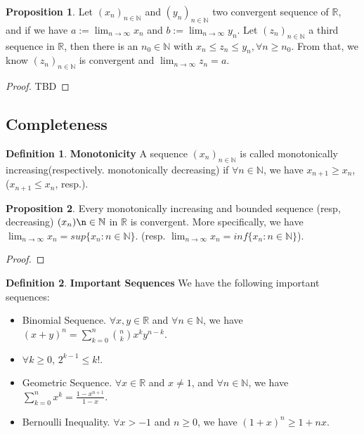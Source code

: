 \documentclass{article}
\theoremstyle{definition}
\newtheorem{defi}{Definition}[subsection]
\newtheorem{prop}{Proposition}[subsection]
\begin{document}
\begin{prop}
Let $(x_n)_{n\in\mathbb{N}}$ and $(y_n)_{n\in\mathbb{N}}$ two convergent sequence of $\mathbb{R}$, and if we have $a:=\lim_{n\to\infty}x_{n}$ and $b:=\lim_{n\to\infty}y_{n}$. Let $(z_n)_{n\in\mathbb{N}}$ a third sequence in $\mathbb{R}$, then there is an $n_0\in\mathbb{N}$ with $x_n\leq z_n \leq y_n, \forall n \geq n_0$. From that, we know $(z_n)_{n\in\mathbb{N}}$ is convergent and $\lim_{n\to\infty}z_n=a$.
\begin{proof}
TBD
\end{proof}
\end{prop}

\subsection{Completeness}

\begin{defi}
\textbf{Monotonicity} A sequence $(x_n)_{n\in\mathbb{N}}$ is called monotonically increasing(respectively. monotonically decreasing) if $\forall n\in\mathbb{N}$, we have $x_{n+1}\geq x_n$, ($x_{n+1}\leq x_n$, resp.).
\end{defi}

\begin{prop}
\label{mono_sequence_is_convergent}
Every monotonically increasing and bounded sequence (resp, decreasing) $(x_n)\n\in\mathbb{N}$ in $\mathbb{R}$ is convergent. More specifically, we have $\lim_{n\to\infty}x_n = sup\{x_n: n\in\mathbb{N}\}$. (resp. $\lim_{n\to\infty}x_n=inf\{x_n: n\in\mathbb{N}\}$).
\begin{proof}

\end{proof}
\end{prop}

\begin{defi}
\textbf{Important Sequences} We have the following important sequences:
\begin{itemize}
    \item Binomial Sequence. $\forall x,y\in\mathbb{R}$ and $\forall n\in\mathbb{N}$, we have $(x+y)^n=\sum_{k=0}^{n}\binom{n}{k}x^{k}y^{n-k}$.
    \item $\forall k\geq0$, $2^{k-1}\leq k!$.
    \item Geometric Sequence. $\forall x \in\mathbb{R}$ and $x\neq 1$, and $\forall n\in\mathbb{N}$, we have $\sum_{k=0}^{n}x^k=\frac{1-x^{n+1}}{1-x}$.
    \item Bernoulli Inequality. $\forall x>-1$ and $n\geq 0$, we have $(1+x)^{n}\geq 1+nx$.
\end{itemize}
\end{defi}
\end{document}
